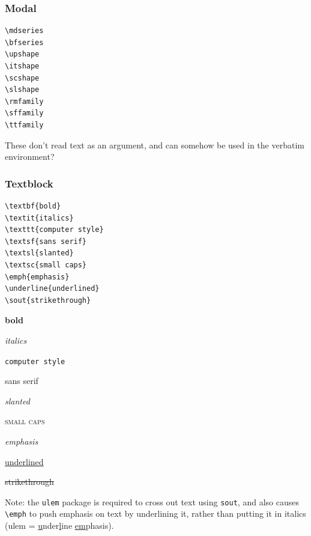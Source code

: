 \documentclass{article}
\begin{document}
\subsubsection{Modal}

\begin{minipage}[t]{0.5\textwidth}
\begin{lstlisting}
\mdseries
\bfseries
\upshape
\itshape
\scshape
\slshape
\rmfamily
\sffamily
\ttfamily
\end{lstlisting}
\end{minipage}%
\begin{minipage}[t]{0.5\textwidth}
    These don't read text as an argument, and can somehow be
    used in the verbatim environment?
\end{minipage}

\subsubsection{Textblock}
\begin{minipage}[t]{0.5\textwidth}
\begin{lstlisting}
\textbf{bold}
\textit{italics}
\texttt{computer style}
\textsf{sans serif}
\textsl{slanted}
\textsc{small caps}
\emph{emphasis}
\underline{underlined}
\sout{strikethrough}
\end{lstlisting}
\end{minipage}%
\begin{minipage}[t]{0.5\textwidth}
    \begin{list}{}
        \item \textbf{bold}
        \item \textit{italics}
        \item \texttt{computer style}
        \item \textsf{sans serif}
        \item \textsl{slanted}
        \item \textsc{small caps}
        \item \emph{emphasis}
        \item \underline{underlined}
        \item \sout{strikethrough}
    \end{list}
\end{minipage}

Note: the \verb|ulem| package is required to cross out text using
\verb|sout|, and also causes \verb|\emph| to push emphasis on
text by underlining it, rather than putting it in italics
(ulem = \underline{u}nder\underline{l}ine \underline{em}phasis).
\end{document}
